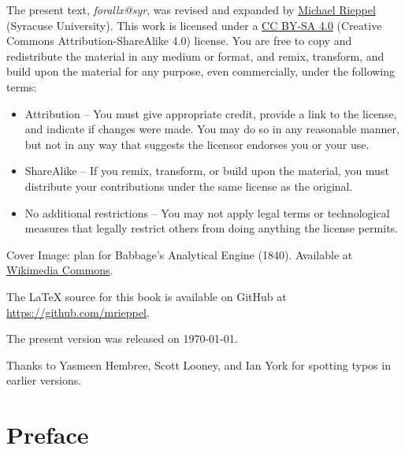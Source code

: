 \vspace{1ex}

\noindent The present text, \emph{forallx@syr}, was revised and expanded by \href{https://mrieppel.net/}{Michael Rieppel} (Syracuse University).  This work is licensed under a \href{https://creativecommons.org/licenses/by-sa/4.0/}{CC BY-SA 4.0} (Creative Commons Attribution-ShareAlike 4.0) license.  You are free to copy and redistribute the material in any medium or format, and  remix, transform, and build upon the material for any purpose, even commercially, under the following terms:
\begin{itemize}
\item Attribution -- You must give appropriate credit, provide a link to the license, and indicate if changes were made. You may do so in any reasonable manner, but not in any way that suggests the licensor endorses you or your use.

\item ShareAlike -- If you remix, transform, or build upon the material, you must distribute your contributions under the same license as the original.

\item No additional restrictions -- You may not apply legal terms or technological measures that legally restrict others from doing anything the license permits.
\end{itemize}

\vspace{1ex}
\noindent Cover Image: plan for Babbage's Analytical Engine (1840). Available at \href{https://commons.wikimedia.org/wiki/File:Babbage_Analytical_Engine_Plan_1840_CHM.agr.jpg}{Wikimedia Commons}.

\vspace{1ex}

\noindent The \LaTeX{} source for this book is available on GitHub at \href{https://github.com/mrieppel}{https://github.com/mrieppel}. 

\vspace{1ex}

\noindent The present version was released on \today.

\vspace{1ex}
\noindent Thanks to Yasmeen Hembree, Scott Looney, and Ian York for spotting typos in earlier versions.

\newpage
\normalsize
\chapter*{Preface}

